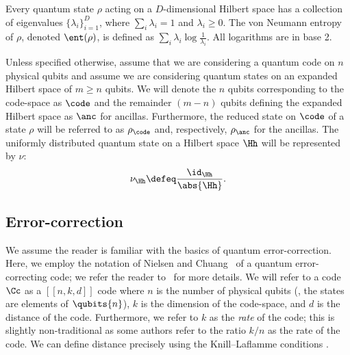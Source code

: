 \documentclass{toc}
\begin{document}
Every quantum state $\rho$ acting on a $D$-dimensional Hilbert space has a collection of eigenvalues $\{\lambda_i\}_{i=1}^D$, where $\sum_i\lambda_i=1$ and $\lambda_i\geq 0$. The von Neumann entropy of $\rho$, denoted $\ent(\rho)$, is defined as $\sum_i \lambda_i \log\frac{1}{\lambda_i}$. All logarithms are in base 2.

Unless specified otherwise, assume that we are considering a quantum code 
on $n$ physical qubits and assume we are considering quantum states on an expanded Hilbert space of $m \geq n$ qubits. We will denote the $n$ qubits corresponding to the code-space as $\code$ and the remainder $(m - n)$ qubits defining the expanded Hilbert space as $\anc$ for ancillas. Furthermore, the reduced
%
state on $\code$ of a state $\rho$ will be referred to as $\rho_\code$ and, respectively, $\rho_\anc$ for the ancillas. The uniformly distributed quantum state on a Hilbert space $\Hh$ will be represented by $\nu$:
\begin{align}
    \nu_\Hh \defeq \frac{\id_\Hh}{\abs{\Hh}}.
\end{align}


\subsection{Error-correction}  
%
We assume the reader is familiar with the basics of quantum error-correction. Here, we employ the notation of Nielsen and Chuang~\cite{Nielsen_Chuang_2010} of a quantum error-correcting code; we refer the reader to~\cite{Nielsen_Chuang_2010} for more details. We will refer to a code $\Cc$ as a $[[n,k,d]]$ code where $n$ is the number of physical qubits (\ie, the states are elements of $\qubits{n}$), $k$ is the dimension of the code-space, and $d$ is the distance of the code. Furthermore, we refer to $k$ as the \emph{rate} of the code; this is slightly non-traditional 
as some %
authors  %
refer to the ratio $k/n$ as the rate of the code. We can define distance precisely using the 
Knill--Laflamme conditions \cite{PhysRevA.55.900}.
%
%
\end{document}
